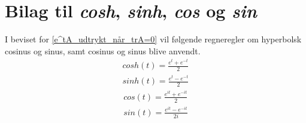 \section{Bilag til \textit{cosh}, \textit{sinh}, \textit{cos} og \textit{sin}} \label{bilag:cos_og_sin}

I beviset for \autoref{e^tA_udtrykt_når_trA=0} vil følgende regneregler om hyperbolsk cosinus og sinus, samt cosinus og sinus blive anvendt.
\begin{align} \label{eq:sinh_og_cosh}
    cosh(t) = \frac{e^t+e^{-t}}{2}\\
    sinh(t) = \frac{e^t-e^{-t}}{2}
\end{align}
\begin{align}\label{eq:sin_og_cos}
    cos(t) = \frac{e^{it}+e^{-it}}{2}\\
    sin(t)=\frac{e^{it}-e^{-it}}{2i}
\end{align}
